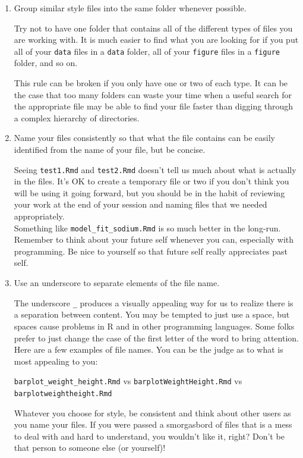 \documentclass[]{tufte-book}
\begin{document}
\begin{enumerate}
\def\labelenumi{\arabic{enumi}.}
\item
  Group similar style files into the same folder whenever possible.

  Try not to have one folder that contains all of the different types of
  files you are working with. It is much easier to find what you are
  looking for if you put all of your \texttt{data} files in a
  \texttt{data} folder, all of your \texttt{figure} files in a
  \texttt{figure} folder, and so on.

  This rule can be broken if you only have one or two of each type. It
  can be the case that too many folders can waste your time when a
  useful search for the appropriate file may be able to find your file
  faster than digging through a complex hierarchy of directories.
\item
  Name your files consistently so that what the file contains can be
  easily identified from the name of your file, but be concise.

  Seeing \texttt{test1.Rmd} and \texttt{test2.Rmd} doesn't tell us much
  about what is actually in the files. It's OK to create a temporary
  file or two if you don't think you will be using it going forward, but
  you should be in the habit of reviewing your work at the end of your
  session and naming files that we needed appropriately.\\
  Something like \texttt{model\_fit\_sodium.Rmd} is so much better in
  the long-run.\\
  Remember to think about your future self whenever you can, especially
  with programming. Be nice to yourself so that future self really
  appreciates past self.
\item
  Use an underscore to separate elements of the file name.

  The underscore \texttt{\_} produces a visually appealing way for us to
  realize there is a separation between content. You may be tempted to
  just use a space, but spaces cause problems in R and in other
  programming languages. Some folks prefer to just change the case of
  the first letter of the word to bring attention. Here are a few
  examples of file names. You can be the judge as to what is most
  appealing to you:

  \texttt{barplot\_weight\_height.Rmd} vs
  \texttt{barplotWeightHeight.Rmd} vs \texttt{barplotweightheight.Rmd}

  Whatever you choose for style, be consistent and think about other
  users as you name your files. If you were passed a smorgasbord of
  files that is a mess to deal with and hard to understand, you wouldn't
  like it, right? Don't be that person to someone else (or yourself)!
\end{enumerate}
\end{document}
